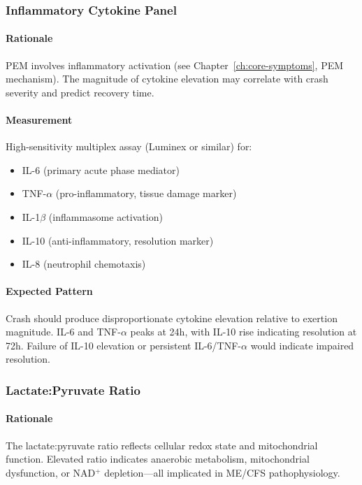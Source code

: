\subsubsection{Inflammatory Cytokine Panel}

\paragraph{Rationale}
PEM involves inflammatory activation (see Chapter~\ref{ch:core-symptoms}, PEM mechanism). The magnitude of cytokine elevation may correlate with crash severity and predict recovery time.

\paragraph{Measurement}
High-sensitivity multiplex assay (Luminex or similar) for:
\begin{itemize}
    \item IL-6 (primary acute phase mediator)
    \item TNF-$\alpha$ (pro-inflammatory, tissue damage marker)
    \item IL-1$\beta$ (inflammasome activation)
    \item IL-10 (anti-inflammatory, resolution marker)
    \item IL-8 (neutrophil chemotaxis)
\end{itemize}

\paragraph{Expected Pattern}
Crash should produce disproportionate cytokine elevation relative to exertion magnitude. IL-6 and TNF-$\alpha$ peaks at 24h, with IL-10 rise indicating resolution at 72h. Failure of IL-10 elevation or persistent IL-6/TNF-$\alpha$ would indicate impaired resolution.

\subsubsection{Lactate:Pyruvate Ratio}

\paragraph{Rationale}
The lactate:pyruvate ratio reflects cellular redox state and mitochondrial function. Elevated ratio indicates anaerobic metabolism, mitochondrial dysfunction, or NAD$^+$ depletion---all implicated in ME/CFS pathophysiology.

